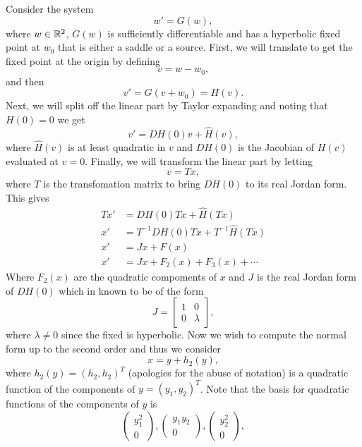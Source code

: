 \documentclass[12pt]{report}
\begin{document}
\begin{solution}
    
    \noindent
    Consider the system
    \[ 
        w' = G(w),    
    \]
    where $w \in {\mathbb R}^2$, $G(w)$ is sufficiently differentiable and has a hyperbolic fixed point at $w_0$ that is either a saddle or a source. First, we will translate to get the fixed point at the origin by defining 
    \[
        v = w - w_0,
    \]
    and then
    \[
        v' = G(v + w_0) = H(v). 
    \]
    Next, we will split off the linear part by Taylor expanding and noting that $H(0) = 0$ we get
    \[
        v' = DH(0)v + \hat{H}(v),
    \]
    where $\hat{H}(v)$ is at least quadratic in $v$ and $DH(0)$ is the Jacobian of $H(v)$ evaluated at $v=0$. Finally, we will transform the linear part by letting 
    \[
        v = Tx,
    \] 
    where $T$ is the transfomation matrix to bring $DH(0)$ to its real Jordan form. This gives
    \begin{align*}
        Tx' &= DH(0)Tx + \hat{H}(Tx)\\
        x' &= T^{-1}DH(0)Tx + T^{-1}\hat{H}(Tx)\\
        x' &= Jx + F(x)\\
        x' &= Jx + F_2(x) + F_3(x) + \cdots
    \end{align*}
    Where $F_2(x)$ are the quadratic compoments of $x$ and $J$ is the real Jordan form of $DH(0)$ which in known to be of the form
    \[
        J = \begin{bmatrix}
            1 & 0 \\ 0 & \lambda
        \end{bmatrix},
    \]
    where $\lambda \neq 0$ since the fixed is hyperbolic. Now we wish to compute the normal form up to the second order and thus we consider 
    \[
        x = y + h_2(y),
    \]
    where $h_2(y) = (h_2,h_2)^T$ (apologies for the abuse of notation) is a quadratic function of the components of $y = (y_1,y_2)^T$. Note that the basis for quadratic functions of the components of $y$ is
    \[
        \begin{pmatrix}
            y_1^2 \\ 0
        \end{pmatrix},
        \begin{pmatrix}
            y_1y_2 \\ 0
        \end{pmatrix},
        \begin{pmatrix}
            y_2^2 \\ 0
        \end{pmatrix},
\]
\end{solution}
\end{document}
